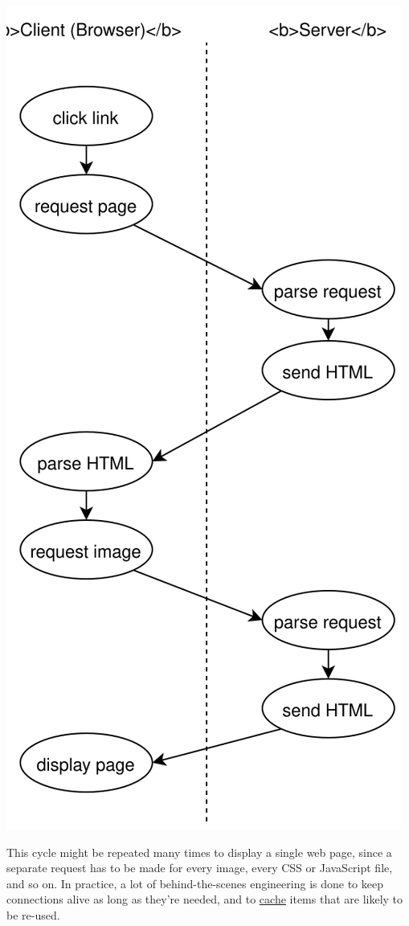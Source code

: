 \includegraphics{../../files/server-cycle.svg}

This cycle might be repeated many times to display a single web page,
since a separate request has to be made for every image, every CSS or
JavaScript file, and so on. In practice, a lot of behind-the-scenes
engineering is done to keep connections alive as long as they're needed,
and to \protect\hyperlink{g:cache}{cache} items that are likely to be
re-used.

